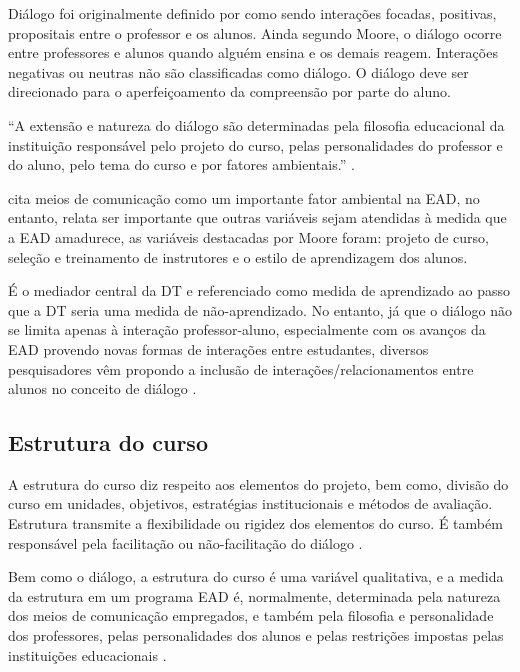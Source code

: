 Diálogo foi originalmente definido por  como
sendo interações focadas, positivas, propositais entre o professor e os alunos.
Ainda segundo Moore, o diálogo ocorre entre professores e alunos quando alguém
ensina e os demais reagem. Interações negativas ou neutras não são classificadas
como diálogo. O diálogo deve ser direcionado para o aperfeiçoamento da
compreensão por parte do aluno.

``A extensão e natureza do diálogo são determinadas pela filosofia educacional
da instituição responsável pelo projeto do curso, pelas personalidades do
professor e do aluno, pelo tema do curso e por fatores ambientais.''
\cite[p.~438]{cabau2018teoria}.

 cita meios de comunicação como um importante
fator ambiental na EAD, no entanto, relata ser importante que outras variáveis
sejam atendidas à medida que a EAD amadurece, as variáveis destacadas por Moore
foram: projeto de curso, seleção e treinamento de instrutores e o estilo de
aprendizagem dos alunos.

É o mediador central da DT e referenciado como medida de aprendizado ao passo
que a DT seria uma medida de não-aprendizado. No entanto, já que o diálogo não
se limita apenas à interação professor-aluno, especialmente com os avanços da
EAD provendo novas formas de interações entre estudantes, diversos pesquisadores
vêm propondo a inclusão de interações/relacionamentos entre alunos no conceito
de diálogo
\cite{benson2009addressing,chen1999dimensions,huang2016understanding}.

\subsection{Estrutura do curso}

A estrutura do curso diz respeito aos elementos do projeto, bem como, divisão do
curso em unidades, objetivos, estratégias institucionais e métodos de avaliação.
Estrutura transmite a flexibilidade ou rigidez dos elementos do curso. É também
responsável pela facilitação ou não-facilitação do diálogo
\cite{moore2008teoria}.

Bem como o diálogo, a estrutura do curso é uma variável qualitativa, e a
medida da estrutura em um programa EAD é, normalmente, determinada pela natureza
dos meios de comunicação empregados, e também pela filosofia e personalidade dos
professores, pelas personalidades dos alunos e pelas restrições impostas pelas
instituições educacionais \cite{moore2008teoria}.

